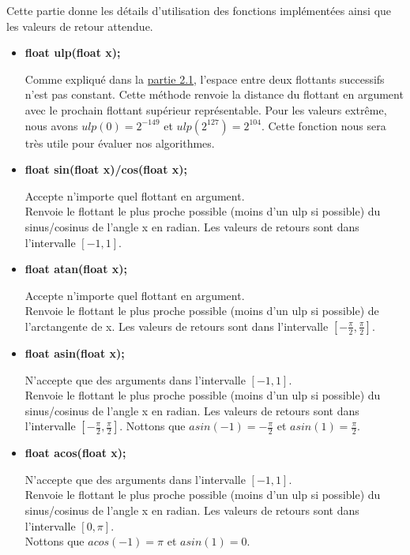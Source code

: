 \documentclass[12pt]{article}
\begin{document}
Cette partie donne les détails d'utilisation des fonctions implémentées ainsi que les valeurs de
retour attendue.
\begin{itemize}

\item \textbf{float ulp(float x);}

Comme expliqué dans la \hyperref[sec:notions]{partie 2.1}, l'espace entre deux flottants successifs n'est pas constant.
Cette méthode renvoie la distance du flottant en argument avec le prochain flottant supérieur représentable.
Pour les valeurs extrême, nous avons $ulp(0) = 2^{-149}$ et $ulp(2^{127}) = 2^{104}$. Cette fonction
nous sera très utile pour évaluer nos algorithmes.

\item \textbf{float sin(float x)/cos(float x);}

Accepte n'importe quel flottant en argument.\\
Renvoie le flottant le plus proche possible (moins d'un ulp si possible) du sinus/cosinus de l'angle x en radian.
Les valeurs de retours sont dans l'intervalle $[-1,1]$.

\item \textbf{float atan(float x);}

Accepte n'importe quel flottant en argument.\\
Renvoie le flottant le plus proche possible (moins d'un ulp si possible) de l'arctangente de x.
Les valeurs de retours sont dans l'intervalle $[-\frac{\pi}{2}, \frac{\pi}{2}]$.

\item \textbf{float asin(float x);}

N'accepte que des arguments dans l'intervalle $[-1,1]$.\\
Renvoie le flottant le plus proche possible (moins d'un ulp si possible) du sinus/cosinus de l'angle x en radian.
Les valeurs de retours sont dans l'intervalle $[-\frac{\pi}{2}, \frac{\pi}{2}]$.
Nottons que $asin(-1) = -\frac{\pi}{2}$ et $asin(1) = \frac{\pi}{2}$.

\item \textbf{float acos(float x);}

N'accepte que des arguments dans l'intervalle $[-1,1]$.\\
Renvoie le flottant le plus proche possible (moins d'un ulp si possible) du sinus/cosinus de l'angle x en radian.
Les valeurs de retours sont dans l'intervalle $[0, \pi]$. \\
Nottons que $acos(-1) = \pi$ et $asin(1) = 0$.


\end{itemize}
\end{document}
